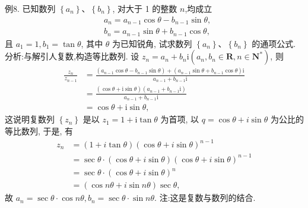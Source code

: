 例8. 已知数列 $\left\{a_n\right\} 、\left\{b_n\right\}$, 对大于 1 的整数 $n$,均成立
$$
\begin{aligned}
& a_n=a_{n-1} \cos \theta-b_{n-1} \sin \theta, \\
& b_n=a_{n-1} \sin \theta+b_{n-1} \cos \theta,
\end{aligned}
$$
且 $a_1=1, b_1=\tan \theta$, 其中 $\theta$ 为已知锐角, 试求数列 $\left\{a_n\right\} 、\left\{b_n\right\}$ 的通项公式.
分析:与解引人复数,构造等比数列.
设 $z_n=a_n+b_n \mathrm{i}\left(a_n, b_n \in \mathbf{R}, n \in \mathbf{N}^*\right)$, 则
$$
\begin{aligned}
\frac{z_n}{z_{n-1}} & =\frac{\left(a_{n-1} \cos \theta-b_{n-1} \sin \theta\right)+\left(a_{n-1} \sin \theta+b_{n-1} \cos \theta\right) \mathrm{i}}{a_{n-1}+b_{n-1} \mathrm{i}} \\
& =\frac{(\cos \theta+\mathrm{i} \sin \theta)\left(a_{n-1}+b_{n-1} \mathrm{i}\right)}{a_{n-1}+b_{n-1} \mathrm{i}} \\
& =\cos \theta+\mathrm{i} \sin \theta,
\end{aligned}
$$
这说明复数列 $\left\{z_n\right\}$ 是以 $z_1=1+\mathrm{i} \tan \theta$ 为首项, 以 $q=\cos \theta+i \sin \theta$ 为公比的等比数列, 于是, 有
$$
\begin{aligned}
z_n & =(1+i \tan \theta)(\cos \theta+i \sin \theta)^{n-1} \\
& =\sec \theta \cdot(\cos \theta+i \sin \theta)(\cos \theta+i \sin \theta)^{n-1} \\
& =\sec \theta \cdot(\cos \theta+i \sin \theta)^n \\
& =(\cos n \theta+i \sin n \theta) \sec \theta,
\end{aligned}
$$
故 $a_n=\sec \theta \cdot \cos n \theta, b_n=\sec \theta \cdot \sin n \theta$.
注:这是复数与数列的结合.


